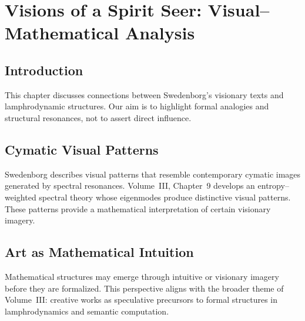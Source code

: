 
\chapter{Visions of a Spirit Seer: Visual--Mathematical Analysis}
\label{chap:spirit-seer}

\section{Introduction}

This chapter discusses connections between Swedenborg's visionary texts
and lamphrodynamic structures. Our aim is to highlight formal analogies
and structural resonances, not to assert direct influence.

\section{Cymatic Visual Patterns}

Swedenborg describes visual patterns that resemble contemporary cymatic
images generated by spectral resonances. Volume~III, Chapter~9 develops an
entropy--weighted spectral theory whose eigenmodes produce distinctive
visual patterns. These patterns provide a mathematical interpretation of
certain visionary imagery.

\section{Art as Mathematical Intuition}

Mathematical structures may emerge through intuitive or visionary imagery
before they are formalized. This perspective aligns with the broader
theme of Volume~III: creative works as speculative precursors to formal
structures in lamphrodynamics and semantic computation.


\newpage
